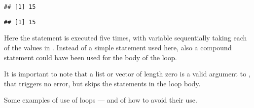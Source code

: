 \documentclass[krantz2]{krantz}\usepackage{knitr}%
\begin{document}
\begin{knitrout}\footnotesize
{}\color{fgcolor}\begin{kframe}
\begin{alltt}
 \hlkwb{<-} 
   \hlopt{:} \hlkwb{<-}  \hlopt{+} 
\end{alltt}
\begin{verbatim}
## [1] 15
\end{verbatim}
\begin{alltt}
 \hlkwb{<-} \hlstd{(}\hlopt{:}\hlstd{)} 
\end{alltt}
\begin{verbatim}
## [1] 15
\end{verbatim}
\end{kframe}
\end{knitrout}

Here the statement  is executed five times, with variable  sequentially taking each of the values in . Instead of a simple statement used here, also a compound statement could have been used for the body of the  loop.

\begin{warningbox}
It is important to note that a list or vector of length zero is a valid argument to , that triggers no error, but skips the statements in the loop body.
\end{warningbox}

Some examples of use of  loops --- and of how to avoid their use.
\end{document}
